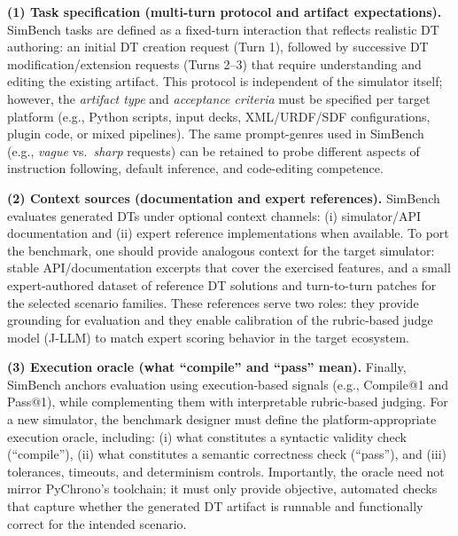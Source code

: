 \textbf{(1) Task specification (multi-turn protocol and artifact expectations).}
SimBench tasks are defined as a fixed-turn interaction that reflects realistic DT authoring: an initial DT creation request (Turn 1), followed by successive DT modification/extension requests (Turns 2--3) that require understanding and editing the existing artifact. This protocol is independent of the simulator itself; however, the \emph{artifact type} and \emph{acceptance criteria} must be specified per target platform (e.g., Python scripts, input decks, XML/URDF/SDF configurations, plugin code, or mixed pipelines). The same prompt-genres used in SimBench (e.g., \emph{vague} vs.\ \emph{sharp} requests) can be retained to probe different aspects of instruction following, default inference, and code-editing competence.

\textbf{(2) Context sources (documentation and expert references).}
SimBench evaluates generated DTs under optional context channels: (i) simulator/API documentation and (ii) expert reference implementations when available. To port the benchmark, one should provide analogous context for the target simulator: stable API/documentation excerpts that cover the exercised features, and a small expert-authored dataset of reference DT solutions and turn-to-turn patches for the selected scenario families. These references serve two roles: they provide grounding for evaluation and they enable calibration of the rubric-based judge model (J-LLM) to match expert scoring behavior in the target ecosystem.

\textbf{(3) Execution oracle (what ``compile'' and ``pass'' mean).}
Finally, SimBench anchors evaluation using execution-based signals (e.g., Compile@1 and Pass@1), while complementing them with interpretable rubric-based judging. For a new simulator, the benchmark designer must define the platform-appropriate execution oracle, including: (i) what constitutes a syntactic validity check (``compile''), (ii) what constitutes a semantic correctness check (``pass''), and (iii) tolerances, timeouts, and determinism controls. Importantly, the oracle need not mirror PyChrono's toolchain; it must only provide objective, automated checks that capture whether the generated DT artifact is runnable and functionally correct for the intended scenario.

